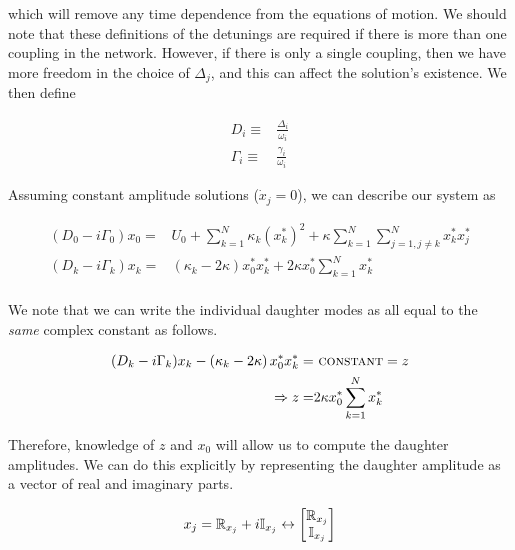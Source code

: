 which will remove any time dependence from the equations of motion. We should note that these definitions of the detunings are required if there is more than one coupling in the network. However, if there is only a single coupling, then we have more freedom in the choice of $\Delta_j$, and this can affect the solution's existence. We then define 

\begin{subequations}
\begin{align}
D_i \equiv & \frac{\Delta_i}{\omega_i} \\
\Gamma_i \equiv & \frac{\gamma_i}{\omega_i}
\end{align}
\end{subequations}

Assuming constant amplitude solutions ($\dot{x}_j=0$), we can describe our system as

\begin{subequations}
\begin{align}
(D_0 -i\Gamma_0)x_0 = & U_0 + \sum_{k=1}^{N} \kappa_k \left(x_k^\ast\right)^2 + \kappa \sum_{k=1}^{N}\sum_{j=1, j\neq k}^{N} x_k^\ast x_j^\ast \\
(D_k -i\Gamma_k)x_k = & \left( \kappa_k - 2\kappa \right) x_0^\ast x_k^\ast + 2\kappa x_0^\ast \sum_{k=1}^{N} x_k^\ast \\
\end{align}
\end{subequations}

We note that we can write the individual daughter modes as all equal to the \emph{same} complex constant as follows.

\begin{subequations}
\begin{align}
(D_k -i\Gamma_k)x_k - \left( \kappa_k - 2\kappa \right) x_0^\ast x_k^\ast = &\ \textsc{constant} = z\\
                                                            \Rightarrow z = & 2\kappa x_0^\ast \sum_{k=1}^{N} x_k^\ast
\end{align}
\end{subequations}

Therefore, knowledge of $z$ and $x_0$ will allow us to compute the daughter amplitudes. We can do this explicitly by representing the daughter amplitude as a vector of real and imaginary parts.

\begin{equation}
x_j = \mathbb{R}_{x_j} + i\mathbb{I}_{x_j} \leftrightarrow \begin{bmatrix}\mathbb{R}_{x_j} \\ \mathbb{I}_{x_j}\\ \end{bmatrix}
\end{equation}


